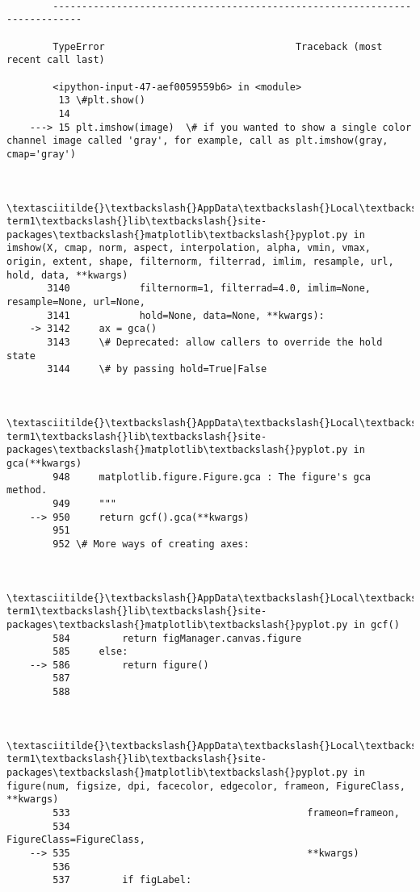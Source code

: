 \documentclass[11pt]{article}
\begin{document}
    \begin{Verbatim}[commandchars=\\\{\}]

        ---------------------------------------------------------------------------

        TypeError                                 Traceback (most recent call last)

        <ipython-input-47-aef0059559b6> in <module>
         13 \#plt.show()
         14 
    ---> 15 plt.imshow(image)  \# if you wanted to show a single color channel image called 'gray', for example, call as plt.imshow(gray, cmap='gray')
    

        \textasciitilde{}\textbackslash{}AppData\textbackslash{}Local\textbackslash{}Continuum\textbackslash{}miniconda3\textbackslash{}envs\textbackslash{}carnd-term1\textbackslash{}lib\textbackslash{}site-packages\textbackslash{}matplotlib\textbackslash{}pyplot.py in imshow(X, cmap, norm, aspect, interpolation, alpha, vmin, vmax, origin, extent, shape, filternorm, filterrad, imlim, resample, url, hold, data, **kwargs)
       3140            filternorm=1, filterrad=4.0, imlim=None, resample=None, url=None,
       3141            hold=None, data=None, **kwargs):
    -> 3142     ax = gca()
       3143     \# Deprecated: allow callers to override the hold state
       3144     \# by passing hold=True|False
    

        \textasciitilde{}\textbackslash{}AppData\textbackslash{}Local\textbackslash{}Continuum\textbackslash{}miniconda3\textbackslash{}envs\textbackslash{}carnd-term1\textbackslash{}lib\textbackslash{}site-packages\textbackslash{}matplotlib\textbackslash{}pyplot.py in gca(**kwargs)
        948     matplotlib.figure.Figure.gca : The figure's gca method.
        949     """
    --> 950     return gcf().gca(**kwargs)
        951 
        952 \# More ways of creating axes:
    

        \textasciitilde{}\textbackslash{}AppData\textbackslash{}Local\textbackslash{}Continuum\textbackslash{}miniconda3\textbackslash{}envs\textbackslash{}carnd-term1\textbackslash{}lib\textbackslash{}site-packages\textbackslash{}matplotlib\textbackslash{}pyplot.py in gcf()
        584         return figManager.canvas.figure
        585     else:
    --> 586         return figure()
        587 
        588 
    

        \textasciitilde{}\textbackslash{}AppData\textbackslash{}Local\textbackslash{}Continuum\textbackslash{}miniconda3\textbackslash{}envs\textbackslash{}carnd-term1\textbackslash{}lib\textbackslash{}site-packages\textbackslash{}matplotlib\textbackslash{}pyplot.py in figure(num, figsize, dpi, facecolor, edgecolor, frameon, FigureClass, **kwargs)
        533                                         frameon=frameon,
        534                                         FigureClass=FigureClass,
    --> 535                                         **kwargs)
        536 
        537         if figLabel:
    


\end{Verbatim}
\end{document}
